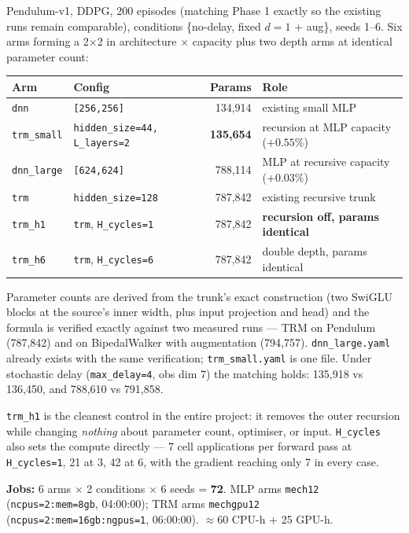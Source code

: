 \documentclass[11pt]{article}
\newcommand{\code}[1]{\texttt{\small #1}}
\begin{document}
Pendulum-v1, DDPG, 200 episodes (matching Phase 1 exactly so the existing runs remain comparable), conditions \{no-delay, fixed $d{=}1$ + aug\}, seeds 1--6. Six arms forming a 2$\times$2 in architecture $\times$ capacity plus two depth arms at identical parameter count:

\begin{center}\small
\begin{tabular}{@{}lp{}rp{}@{}}
\toprule
\textbf{Arm} & \textbf{Config} & \textbf{Params} & \textbf{Role} \\
\midrule
\code{dnn} & \code{[256,256]} & 134{,}914 & existing small MLP \\
\code{trm\_small} & \code{hidden\_size=44, L\_layers=2} & \textbf{135{,}654} & recursion at MLP capacity ($+0.55\%$) \\
\code{dnn\_large} & \code{[624,624]} & 788{,}114 & MLP at recursive capacity ($+0.03\%$) \\
\code{trm} & \code{hidden\_size=128} & 787{,}842 & existing recursive trunk \\
\code{trm\_h1} & \code{trm}, \code{H\_cycles=1} & 787{,}842 & \textbf{recursion off, params identical} \\
\code{trm\_h6} & \code{trm}, \code{H\_cycles=6} & 787{,}842 & double depth, params identical \\
\bottomrule
\end{tabular}
\end{center}

Parameter counts are derived from the trunk's exact construction (two SwiGLU blocks at the source's inner width, plus input projection and head) and the formula is verified exactly against two measured runs --- TRM on Pendulum (787{,}842) and on BipedalWalker with augmentation (794{,}757). \code{dnn\_large.yaml} already exists with the same verification; \code{trm\_small.yaml} is one file. Under stochastic delay (\code{max\_delay=4}, obs dim 7) the matching holds: 135{,}918 vs 136{,}450, and 788{,}610 vs 791{,}858.

\code{trm\_h1} is the cleanest control in the entire project: it removes the outer recursion while changing \emph{nothing} about parameter count, optimiser, or input. \code{H\_cycles} also sets the compute directly --- 7 cell applications per forward pass at \code{H\_cycles=1}, 21 at 3, 42 at 6, with the gradient reaching only 7 in every case.

\textbf{Jobs:} 6 arms $\times$ 2 conditions $\times$ 6 seeds = \textbf{72}. MLP arms \code{mech12} (\code{ncpus=2:mem=8gb}, 04:00:00); TRM arms \code{mechgpu12} (\code{ncpus=2:mem=16gb:ngpus=1}, 06:00:00). $\approx$60 CPU-h + 25 GPU-h.
\end{document}
